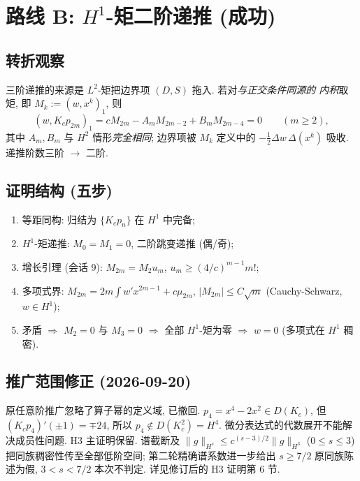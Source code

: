 \documentclass[UTF8]{ctexart}
\begin{document}
\section{路线 B: \texorpdfstring{$H^1$}{H1}-矩二阶递推 (成功)}

\subsection{转折观察}

三阶递推的来源是 $L^2$-矩把边界项 $(D, S)$ 拖入. 若对\emph{与正交条件同源的
内积}取矩, 即 $M_k := (w, x^k)_1$, 则
\begin{equation}
	(w, K_c p_{2m})_1 = c M_{2m} - A_m M_{2m-2} + B_m M_{2m-4} = 0
	\qquad (m \geq 2),
\end{equation}
其中 $A_m, B_m$ 与 $H^2$ 情形\emph{完全相同}; 边界项被 $M_k$ 定义中的
$-\tfrac12 \Delta w\, \Delta(x^k)$ 吸收. 递推阶数三阶 $\to$ 二阶.

\subsection{证明结构 (五步)}

\begin{enumerate}
	\item 等距同构: 归结为 $\{K_c p_n\}$ 在 $H^1$ 中完备;
	\item $H^1$-矩递推: $M_0 = M_1 = 0$, 二阶跳变递推 (偶/奇);
	\item 增长引理 (会话 9): $M_{2m} = M_2 u_m$, $u_m \geq (4/c)^{m-1} m!$;
	\item 多项式界: $M_{2m} = 2m \int w' x^{2m-1} + c \mu_{2m}$,
		$|M_{2m}| \leq C\sqrt m$ (Cauchy-Schwarz, $w \in H^1$);
	\item 矛盾 $\Rightarrow$ $M_2 = 0$ 与 $M_3 = 0$ $\Rightarrow$ 全部
		$H^1$-矩为零 $\Rightarrow$ $w = 0$ (多项式在 $H^1$ 稠密).
\end{enumerate}

\subsection{推广范围修正 (2026-09-20)}
原任意阶推广忽略了算子幂的定义域, 已撤回.
$p_4=x^4-2x^2\in D(K_c)$, 但 $(K_cp_4)'(\pm1)=\mp24$,
所以 $p_4\notin D(K_c^2)=H^4$. 微分表达式的代数展开不能解决成员性问题.
H3 主证明保留. 谱截断及
$\|g\|_{H^s}\le c^{(s-3)/2}\|g\|_{H^3}$ ($0\le s\le3$)
把同族稠密性传至全部低阶空间; 第二轮精确谱系数进一步给出 $s\ge7/2$ 原同族陈述为假,
$3<s<7/2$ 本次不判定. 详见修订后的 H3 证明第 6 节.
\end{document}
